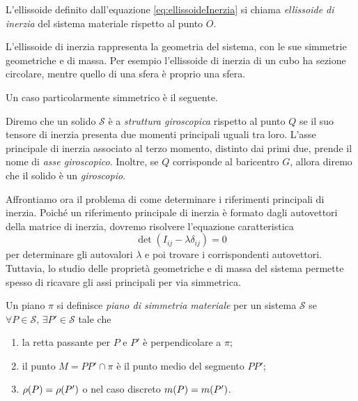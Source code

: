 \begin{definition}
    L'ellissoide definito dall'equazione \eqref{eq:ellissoideInerzia} si chiama \emph{ellissoide di inerzia} del sistema materiale rispetto al punto $O$.
\end{definition}

L'ellissoide di inerzia rappresenta la geometria del sistema, con le sue simmetrie geometriche e di massa. Per esempio l'ellissoide di inerzia di un cubo ha sezione circolare, mentre quello di una sfera è proprio una sfera.

Un caso particolarmente simmetrico è il seguente.
\begin{definition}
    Diremo che un solido $\mathcal{S}$ è a \emph{struttura giroscopica} rispetto al punto $Q$ se il suo tensore di inerzia presenta due momenti principali uguali tra loro.
    L'asse principale di inerzia associato al terzo momento, distinto dai primi due, prende il nome di \emph{asse giroscopico}.
    Inoltre, se $Q$ corrisponde al baricentro $G$, allora diremo che il solido è un \emph{giroscopio}.
\end{definition}

Affrontiamo ora il problema di come determinare i riferimenti principali di inerzia. Poiché un riferimento principale di inerzia è formato dagli autovettori della matrice di inerzia, dovremo risolvere l'equazione caratteristica
\begin{equation*}
    \det(I_{ij} - \lambda \delta_{ij}) = 0
\end{equation*}
per determinare gli autovalori $\lambda$ e poi trovare i corrispondenti autovettori. Tuttavia, lo studio delle proprietà geometriche e di massa del sistema permette spesso di ricavare gli assi principali per via simmetrica.


\begin{definition}
    Un piano $\pi$ si definisce \emph{piano di simmetria materiale} per un sistema $\mathcal{S}$ se $\forall P\in\mathcal{S},\, \exists P'\in\mathcal{S}$ tale che
    \begin{enumerate}[label=$\roman*.$]
        \item la retta passante per $P$ e $P'$ è perpendicolare a $\pi$;
        \item il punto $M = PP'\cap\pi$ è il punto medio del segmento $PP'$;
        \item $\rho\qty(P) = \rho\qty(P')$ o nel caso discreto $m\qty(P) = m\qty(P')$.
    \end{enumerate}
\end{definition}

